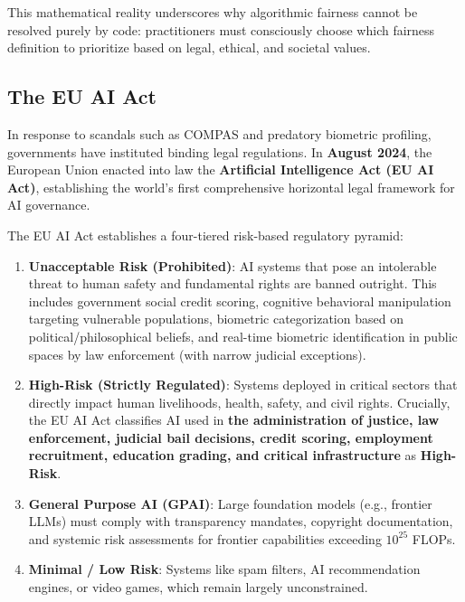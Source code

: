 This mathematical reality underscores why algorithmic fairness cannot be resolved purely by code: practitioners must consciously choose which fairness definition to prioritize based on legal, ethical, and societal values.

\subsection{The EU AI Act}
\label{sec:eu_ai_act}

In response to scandals such as COMPAS and predatory biometric profiling, governments have instituted binding legal regulations. In \textbf{August 2024}, the European Union enacted into law the \textbf{Artificial Intelligence Act (EU AI Act)}, establishing the world's first comprehensive horizontal legal framework for AI governance.

The EU AI Act establishes a four-tiered risk-based regulatory pyramid:
\begin{enumerate}
  \item \textbf{Unacceptable Risk (Prohibited)}: AI systems that pose an intolerable threat to human safety and fundamental rights are banned outright. This includes government social credit scoring, cognitive behavioral manipulation targeting vulnerable populations, biometric categorization based on political/philosophical beliefs, and real-time biometric identification in public spaces by law enforcement (with narrow judicial exceptions).
  \item \textbf{High-Risk (Strictly Regulated)}: Systems deployed in critical sectors that directly impact human livelihoods, health, safety, and civil rights. Crucially, the EU AI Act classifies AI used in \textbf{the administration of justice, law enforcement, judicial bail decisions, credit scoring, employment recruitment, education grading, and critical infrastructure} as \textbf{High-Risk}.
  \item \textbf{General Purpose AI (GPAI)}: Large foundation models (e.g., frontier LLMs) must comply with transparency mandates, copyright documentation, and systemic risk assessments for frontier capabilities exceeding $10^{25}$ FLOPs.
  \item \textbf{Minimal / Low Risk}: Systems like spam filters, AI recommendation engines, or video games, which remain largely unconstrained.
\end{enumerate}


